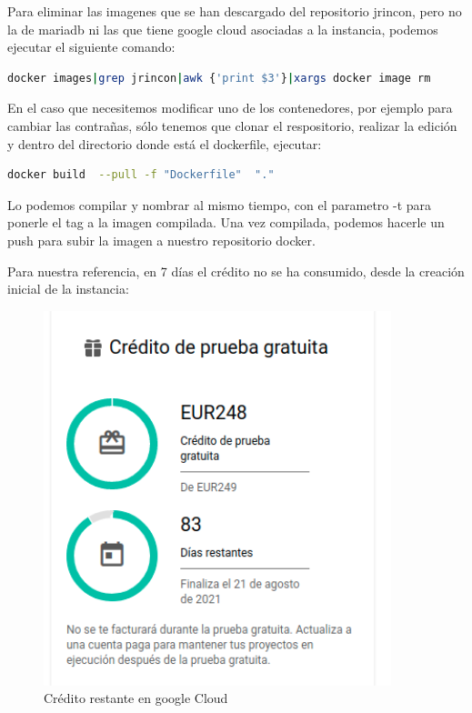 \documentclass[11pt,spanish,listoffigures,listoftables]{tfgetsinf}
\begin{document}
Para eliminar las imagenes que se han descargado del repositorio jrincon, pero no la de mariadb ni las que tiene google cloud asociadas a la instancia, podemos ejecutar el siguiente comando:

\begin{lstlisting}[language=bash, caption={Borrado de imágenes con el texto jrincon}]
  docker images|grep jrincon|awk {'print $3'}|xargs docker image rm
\end{lstlisting}

En el caso que necesitemos modificar uno de los contenedores, por ejemplo para cambiar las contrañas, sólo tenemos que clonar el respositorio, realizar la edición y dentro del directorio donde está el dockerfile, ejecutar:

\begin{lstlisting}[language=bash, caption={Comando docker para construir una imagen}]
  docker build  --pull -f "Dockerfile"  "."
\end{lstlisting}

Lo podemos compilar y nombrar al mismo tiempo, con el parametro -t para ponerle el tag a la imagen compilada. Una vez compilada, podemos hacerle un push para subir la imagen a nuestro repositorio docker.

Para nuestra referencia, en 7 días el crédito no se ha consumido, desde la creación inicial de la instancia:

\begin{figure}[h!] %
  \centering
   \includegraphics[width=0.90\textwidth]{img/Credito.png}
   \caption{Crédito restante en google Cloud}
   \label{fig:creditogoogle}
 \end{figure}
\end{document}
